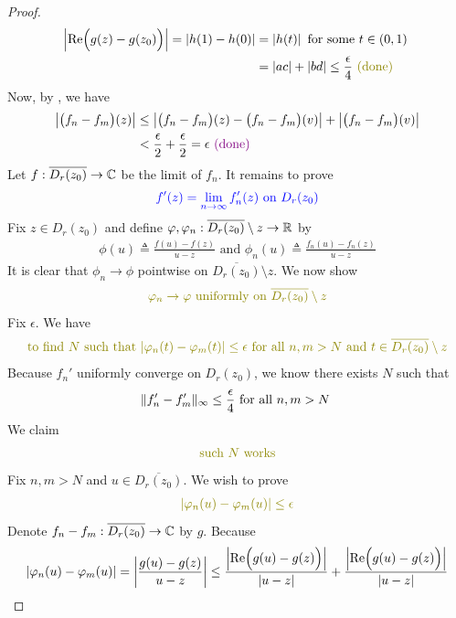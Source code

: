 \documentclass{report}
\begin{document}
\begin{proof}
\begin{align*}
 \abso{\text{Re}\Big(g(z)-g(z_0) \Big)}=\abso{h(1)-h(0)}&=\abso{h(t)}\text{ for some $t\in (0,1)$ }\\
 &=\abso{ac}+\abso{bd}\leq \frac{\epsilon }{4}\odone
\end{align*}
Now, by , we have 
\begin{align*}
  \left|\big(f_n-f_m \big)(z)\right|&\leq \left|\big(f_n-f_m \big)(z)-\big(f_n-f_m \big)(v)\right|+\left|\big(f_n-f_m \big)(v)\right|\\
&<\frac{\epsilon}{2}+\frac{\epsilon}{2}=\epsilon \textcolor{violet}{\text{ (done) }}
\end{align*}
Let $f:\overline{D_r(z_0)}\rightarrow \mathbb{C}$ be the limit of $f_n$. It remains to prove
\begin{align}
\label{UCAC4}
\textcolor{blue}{f'(z)=\lim_{n\to \infty}f_n'(z)\text{ on }D_r(z_0)}
\end{align}
Fix $z\in D_r(z_0)$ and define $\varphi ,\varphi_n:\overline{D_r(z_0)}\setminus z\rightarrow \mathbb{R}$ by 
\begin{align*}
\phi (u)\triangleq \frac{f(u)-f(z)}{u-z}\text{ and }\phi_n(u)\triangleq \frac{f_n(u)-f_n(z)}{u-z}
\end{align*}
It is clear that $\phi_n\to \phi$ pointwise on $\overline{D_r(z_0)}\setminus z$. We now show 
\begin{align*}
\olive{\phi_n\to \phi\text{ uniformly on }\overline{D_r(z_0)}\setminus z}
\end{align*}
Fix $\epsilon $. We have
\begin{align*}
  \olive{\text{ to find $N$ such that  $\abso{\phi_n(t)-\phi _m(t)}\leq \epsilon $ for all $n,m>N$ and  $t\in \overline{D_r(z_0)}\setminus z$ }}
\end{align*}
Because $f_n'$ uniformly converge on  $D_r(z_0)$, we know there exists $N$ such that 
 \begin{align}
\label{CUaC2}
\| f_n'-f_m' \|_\infty\leq \frac{\epsilon}{4} \text{ for all $n,m>N$ }
\end{align}
We claim 
\begin{align*}
\olive{\text{ such }N\text{ works }}
\end{align*}
Fix $n,m>N$ and $u \in \overline{D_r(z_0)}$. We wish to prove 
\begin{align*}
\olive{\abso{\phi_n(u)-\phi_m(u)}\leq \epsilon }
\end{align*}
Denote $f_n-f_m:\overline{D_r(z_0)}\rightarrow \mathbb{C}$ by $g$. Because 
\begin{align*}
\abso{\phi_n(u)-\phi_m(u)}=\abso{\frac{g(u)-g(z)}{u-z}}\leq \frac{\abso{\text{Re}\Big(g(u)-g(z) \Big)}}{\abso{u-z}}+ \frac{\abso{\text{Re}\Big(g(u)-g(z) \Big)}}{\abso{u-z}}

\end{align*}
\end{proof}
\end{document}
